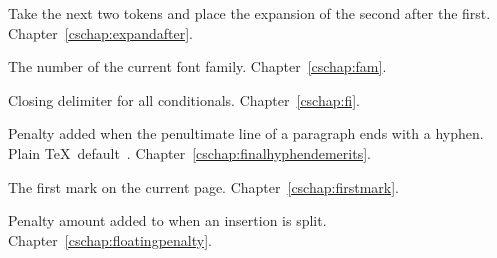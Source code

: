 \begin{glossinventory}
\item [\cs{expandafter}] 
      Take the next two tokens and place the 
      expansion  of the second after the first.
Chapter~\ref{cschap:expandafter}.

\item [\cs{fam}]
      The number of the current font family.
Chapter~\ref{cschap:fam}.

\item [\cs{fi}]
      Closing delimiter for all conditionals.
Chapter~\ref{cschap:fi}.

\item [\cs{finalhyphendemerits}]
      Penalty added when the penultimate line of a 
      paragraph ends with a hyphen. 
      Plain \TeX\ default~.
Chapter~\ref{cschap:finalhyphendemerits}.

\item [\cs{firstmark}]
      The first mark on the current page.
Chapter~\ref{cschap:firstmark}.

\item [\cs{floatingpenalty}]
      Penalty amount added to 
 \alt
      when an insertion is split.
Chapter~\ref{cschap:floatingpenalty}.


\end{glossinventory}
